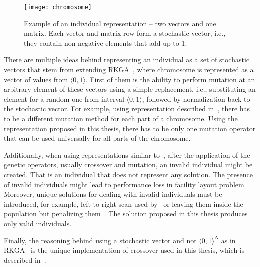 \begin{figure}[htp]
    \texttt{[image: chromosome]}\caption[Example of an individual representation]{
        Example of an individual representation – two vectors and one matrix.
        Each vector and matrix row form a stochastic vector, i.e., they contain non-negative elements that add up to 1.
    }
    \label{fig:chromosome}
\end{figure}

There are multiple ideas behind representing an individual as a set of stochastic vectors that stem
from extending RKGA~\cite{beanGeneticAlgorithmsRandom1994}, where chromosome is represented as a vector of values from $\langle0,1\rangle$.
First of them is the ability to perform mutation at an arbitrary element of these vectors using
a simple replacement, i.e., substituting an element for a random one from interval $\langle0,1 \rangle$,
followed by normalization back to the stochastic vector.
For example, using representation described in~\cite{friedrichIntegratedSlicingTree2018, riponAdaptiveVariableNeighborhood2013},
there has to be a different mutation method for each part of a chromosome.
Using the representation proposed in this thesis, there has to be only one mutation operator that can be used universally for all parts of the chromosome.

Additionally, when using representations similar to~\cite{friedrichIntegratedSlicingTree2018, riponAdaptiveVariableNeighborhood2013},
after the application of the genetic operators, usually crossover and mutation, an invalid individual might be created.
That is an individual that does not represent any solution.
The presence of invalid individuals might lead to performance loss in facility layout problem~\cite{liuMultiimprovedGeneticAlgorithm2012}
Moreover, unique solutions for dealing with invalid individuals must be introduced,
for example, left-to-right scan used by~\cite{hwangGeneticAlgorithmApproach2009, kandasamyEffectiveLocationMicro2020}
or leaving them inside the population but penalizing them~\cite{hwangGeneticAlgorithmApproach2009}.
The solution proposed in this thesis produces only valid individuals.

Finally, the reasoning behind using a stochastic vector and not $\langle0,1\rangle^N$ as in RKGA~\cite{beanGeneticAlgorithmsRandom1994}
is the unique implementation of crossover used in this thesis, which is described in~\cite{subsec:crossover}.

